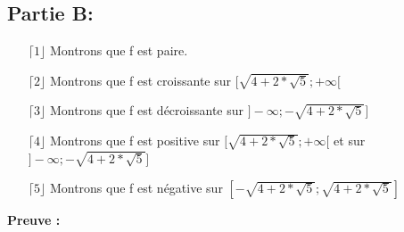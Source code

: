 \documentclass[a4paper, 12pt]{article}
\begin{document}
\newpage

\subsection{Partie B:}

\begin{itemize}
	\item[\(\lceil 1 \rfloor\)] Montrons que f est paire.
	\item[\(\lceil 2 \rfloor\)] Montrons que f est croissante sur \( [ \sqrt{4 + 2 * \sqrt{5}} ; +\infty [ \)
	\item[\(\lceil 3 \rfloor\)] Montrons que f est décroissante sur \( ] -\infty ; -\sqrt{4 + 2 * \sqrt{5}} ] \)
	\item[\(\lceil 4 \rfloor\)] Montrons que f est positive sur \( [ \sqrt{4 + 2 * \sqrt{5}} ; +\infty [ \) et sur \( ] -\infty ; -\sqrt{4 + 2 * \sqrt{5}} ] \)
	\item[\(\lceil 5 \rfloor\)] Montrons que f est négative sur \( [ -\sqrt{4 + 2 * \sqrt{5}} ; \sqrt{4 + 2 * \sqrt{5}} ] \)
\end{itemize}

\textbf{Preuve :}
\end{document}
